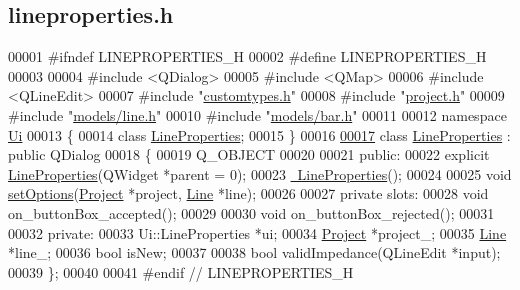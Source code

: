\hypertarget{lineproperties_8h_source}{}\subsection{lineproperties.\+h}
\label{lineproperties_8h_source}

\begin{DoxyCode}
00001 \textcolor{preprocessor}{#ifndef LINEPROPERTIES\_H}
00002 \textcolor{preprocessor}{#define LINEPROPERTIES\_H}
00003 
00004 \textcolor{preprocessor}{#include <QDialog>}
00005 \textcolor{preprocessor}{#include <QMap>}
00006 \textcolor{preprocessor}{#include <QLineEdit>}
00007 \textcolor{preprocessor}{#include "\hyperlink{customtypes_8h}{customtypes.h}"}
00008 \textcolor{preprocessor}{#include "\hyperlink{project_8h}{project.h}"}
00009 \textcolor{preprocessor}{#include "\hyperlink{line_8h}{models/line.h}"}
00010 \textcolor{preprocessor}{#include "\hyperlink{bar_8h}{models/bar.h}"}
00011 
00012 \textcolor{keyword}{namespace }\hyperlink{namespace_ui}{Ui}
00013 \{
00014 \textcolor{keyword}{class }\hyperlink{class_line_properties}{LineProperties};
00015 \}
00016 
\hypertarget{lineproperties_8h_source_l00017}{}\hyperlink{class_line_properties}{00017} \textcolor{keyword}{class }\hyperlink{class_line_properties}{LineProperties} : \textcolor{keyword}{public} QDialog
00018 \{
00019   Q\_OBJECT
00020 
00021 \textcolor{keyword}{public}:
00022   \textcolor{keyword}{explicit} \hyperlink{class_line_properties_a0bc0d7c02db0a4ea920d040f76679fec}{LineProperties}(QWidget *parent = 0);
00023   \hyperlink{class_line_properties_a59017a6580f2e02dc492522d9267de29}{~LineProperties}();
00024 
00025   \textcolor{keywordtype}{void} \hyperlink{class_line_properties_ad434fc8e65787648a44737fb9f46b475}{setOptions}(\hyperlink{class_project}{Project} *project, \hyperlink{class_line}{Line} *line);
00026 
00027 \textcolor{keyword}{private} slots:
00028   \textcolor{keywordtype}{void} on\_buttonBox\_accepted();
00029 
00030   \textcolor{keywordtype}{void} on\_buttonBox\_rejected();
00031 
00032 \textcolor{keyword}{private}:
00033   Ui::LineProperties *ui;
00034   \hyperlink{class_project}{Project} *project\_;
00035   \hyperlink{class_line}{Line} *line\_;
00036   \textcolor{keywordtype}{bool} isNew;
00037 
00038   \textcolor{keywordtype}{bool} validImpedance(QLineEdit *input);
00039 \};
00040 
00041 \textcolor{preprocessor}{#endif // LINEPROPERTIES\_H}
\end{DoxyCode}
